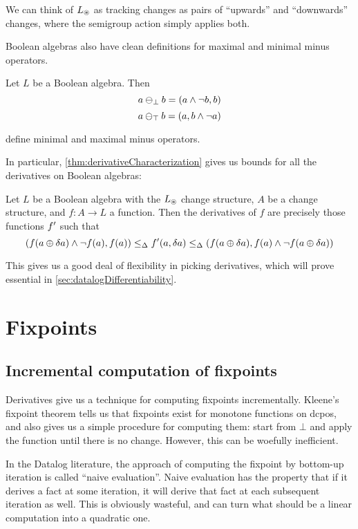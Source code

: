 We can think of $L_\circledast$ as tracking changes as pairs of ``upwards'' and
``downwards'' changes, where the semigroup action simply applies both.

Boolean algebras also have clean definitions for maximal and minimal minus
operators.

\begin{prop}
  Let $L$ be a Boolean algebra. Then
  $$a \ominus_\bot b = (a \wedge \neg b, b)$$
  $$a \ominus_\top b = (a, b \wedge \neg a)$$

  define minimal and maximal minus operators.
\end{prop}

In particular, \ref{thm:derivativeCharacterization} gives us bounds for
all the derivatives on Boolean algebras:

\begin{corollary}
\label{cor:booleanCharacterization}
  Let $L$ be a Boolean algebra with the $L_\circledast$ change structure, $A$ be
  a change structure, and $f: A \rightarrow
  L$ a function. Then the derivatives of $f$ are precisely those functions
  $f'$ such that
  $$
  (
    f(a \oplus \delta a) \wedge \neg f(a), 
    f(a)
  )
  \leq_\Delta
  f'(a, \delta a)
  \leq_\Delta
  (
    f(a \oplus \delta a), 
    f(a) \wedge \neg f(a \oplus \delta a)
  )
  $$
\end{corollary}

This gives us a good deal of flexibility in picking derivatives, which will
prove essential in \ref{sec:datalogDifferentiability}.

\section{Fixpoints}

\subsection{Incremental computation of fixpoints}

Derivatives give us a technique for computing fixpoints incrementally. Kleene's
fixpoint theorem tells us that fixpoints exist for monotone functions on dcpos, and also gives us
a simple procedure for computing them: start from $\bot$ and apply the function
until there is no change. However, this can be woefully inefficient.

In the Datalog literature, the approach of computing the fixpoint by bottom-up
iteration is called ``naive evaluation''. Naive evaluation has the property that
if it derives a fact at some iteration, it will derive that fact at each
subsequent iteration as well. This is obviously wasteful, and can turn what
should be a linear computation into a quadratic one.

